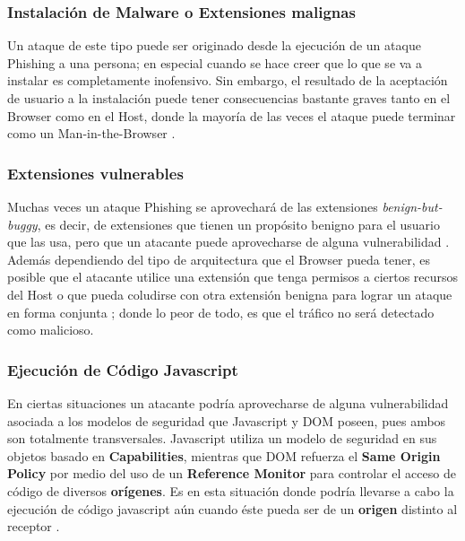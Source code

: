 	\subsubsection{Instalación de Malware o Extensiones malignas}
	Un ataque de este tipo puede ser originado desde la ejecución de un ataque Phishing a una persona; en especial cuando se hace creer que lo que se va a instalar es completamente inofensivo. Sin embargo, el resultado de la aceptación de usuario a la instalación puede tener consecuencias bastante graves tanto en el Browser como en el Host, donde la mayoría de las veces el ataque puede terminar como un Man-in-the-Browser \cite{Utakrit2009, Dougan2012}. 

	\subsubsection{Extensiones vulnerables}
	Muchas veces un ataque Phishing se aprovechará de las extensiones \textit{benign-but-buggy}, es decir, de extensiones que tienen un propósito benigno para el usuario que las usa, pero que un atacante puede aprovecharse de alguna vulnerabilidad \cite{Barth2010, Liu2012}. Además dependiendo del tipo de arquitectura que el Browser pueda tener, es posible que el atacante utilice una extensión que tenga permisos a ciertos recursos del Host o que pueda coludirse con otra extensión benigna para lograr un ataque en forma conjunta \cite{Saini2014}; donde lo peor de todo, es que el tráfico no será detectado como malicioso.

	\subsubsection{Ejecución de Código Javascript}
	En ciertas situaciones un atacante podría aprovecharse de alguna vulnerabilidad asociada a los modelos de seguridad que Javascript y DOM poseen, pues ambos son totalmente transversales. Javascript utiliza un modelo de seguridad en sus objetos basado en \textbf{Capabilities}, mientras que DOM refuerza el \textbf{Same Origin Policy} por medio del uso de un \textbf{Reference Monitor} para controlar el acceso de código de diversos \textbf{orígenes}. Es en esta situación donde podría llevarse a cabo la ejecución de código javascript aún cuando éste pueda ser de un \textbf{origen} distinto al receptor \cite{Barth2009}.

